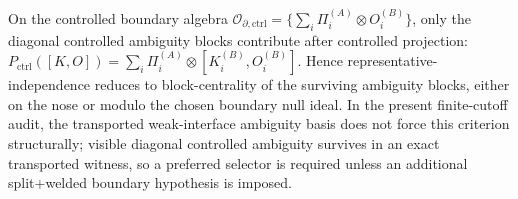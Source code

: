 \begin{remark}
On the controlled boundary algebra \(\mathcal O_{\partial,\mathrm{ctrl}}=\{\sum_i \Pi_i^{(A)}\otimes O_i^{(B)}\}\), only the diagonal controlled ambiguity blocks contribute after controlled projection: \(P_{\mathrm{ctrl}}([K,O])=\sum_i \Pi_i^{(A)}\otimes [K_i^{(B)},O_i^{(B)}]\). Hence representative-independence reduces to block-centrality of the surviving ambiguity blocks, either on the nose or modulo the chosen boundary null ideal. In the present finite-cutoff audit, the transported weak-interface ambiguity basis does not force this criterion structurally; visible diagonal controlled ambiguity survives in an exact transported witness, so a preferred selector is required unless an additional split+welded boundary hypothesis is imposed.
\end{remark}